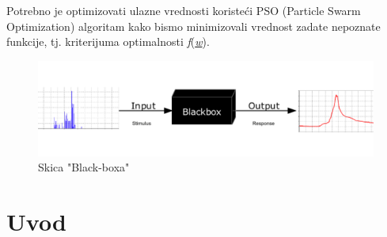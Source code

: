 \documentclass[12pt, a4paper]{article}
\newcommand{\vecw}{\underline{\textit{w}}}
\newcommand{\fw}{\textit{f}(\vecw)}
\begin{document}
    Potrebno je optimizovati ulazne vrednosti koristeći PSO (Particle Swarm Optimization) algoritam
    kako bismo minimizovali vrednost zadate nepoznate funkcije, tj. kriterijuma optimalnosti \fw. 
    

    
    \begin{figure}[h]
        \centering
        \includegraphics[scale=0.36]{Blackbox3D-withGraphs.png}
        \caption{Skica "Black-boxa"\footnotemark}
        \label{fig:Black_box}
    \end{figure}
    
    
    \section{Uvod}
    
\end{document}
